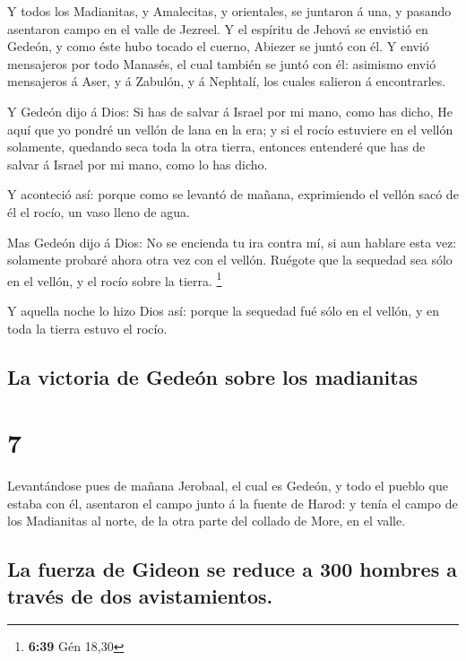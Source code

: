  Y todos los Madianitas, y Amalecitas, y orientales, se
juntaron á una, y pasando asentaron campo en el valle de Jezreel.
 Y el espíritu de Jehová se envistió en Gedeón, y como éste
hubo tocado el cuerno, Abiezer se juntó con él.  Y envió
mensajeros por todo Manasés, el cual también se juntó con él: asimismo
envió mensajeros á Aser, y á Zabulón, y á Nephtalí, los cuales salieron
á encontrarles.

 Y Gedeón dijo á Dios: Si has de salvar á Israel por mi
mano, como has dicho,  He aquí que yo pondré un vellón de
lana en la era; y si el rocío estuviere en el vellón solamente, quedando
seca toda la otra tierra, entonces entenderé que has de salvar á Israel
por mi mano, como lo has dicho.

 Y aconteció así: porque como se levantó de mañana,
exprimiendo el vellón sacó de él el rocío, un vaso lleno de agua.

 Mas Gedeón dijo á Dios: No se encienda tu ira contra mí,
si aun hablare esta vez: solamente probaré ahora otra vez con el vellón.
Ruégote que la sequedad sea sólo en el vellón, y el rocío sobre la
tierra. \footnote{\textbf{6:39} Gén 18,30}

 Y aquella noche lo hizo Dios así: porque la sequedad fué
sólo en el vellón, y en toda la tierra estuvo el rocío.

\hypertarget{la-victoria-de-gedeuxf3n-sobre-los-madianitas}{%
\subsection{La victoria de Gedeón sobre los
madianitas}\label{la-victoria-de-gedeuxf3n-sobre-los-madianitas}}

\hypertarget{section-6}{%
\section{7}\label{section-6}}

 Levantándose pues de mañana Jerobaal, el cual es Gedeón, y
todo el pueblo que estaba con él, asentaron el campo junto á la fuente
de Harod: y tenía el campo de los Madianitas al norte, de la otra parte
del collado de More, en el valle.

\hypertarget{la-fuerza-de-gideon-se-reduce-a-300-hombres-a-travuxe9s-de-dos-avistamientos.}{%
\subsection{La fuerza de Gideon se reduce a 300 hombres a través de dos
avistamientos.}\label{la-fuerza-de-gideon-se-reduce-a-300-hombres-a-travuxe9s-de-dos-avistamientos.}}

